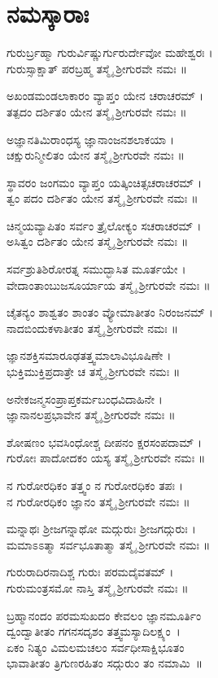 \section{ನಮಸ್ಕಾರಾಃ }
ಗುರುರ್ಬ್ರಹ್ಮಾ ಗುರುರ್ವಿಷ್ಣುರ್ಗುರುರ್ದೇವೋ ಮಹೇಶ್ವರಃ ।\\
ಗುರುಸ್ಸಾಕ್ಷಾತ್ ಪರಬ್ರಹ್ಮ ತಸ್ಮೈ ಶ್ರೀಗುರವೇ ನಮಃ ॥

ಅಖಂಡಮಂಡಲಾಕಾರಂ ವ್ಯಾಪ್ತಂ ಯೇನ ಚರಾಚರಮ್ ।\\
ತತ್ಪದಂ ದರ್ಶಿತಂ ಯೇನ ತಸ್ಮೈ ಶ್ರೀಗುರವೇ ನಮಃ ॥

ಅಜ್ಞಾನತಿಮಿರಾಂಧಸ್ಯ ಜ್ಞಾನಾಂಜನಶಲಾಕಯಾ ।\\
ಚಕ್ಷುರುನ್ಮೀಲಿತಂ ಯೇನ ತಸ್ಮೈ ಶ್ರೀಗುರವೇ ನಮಃ ॥

ಸ್ಥಾವರಂ ಜಂಗಮಂ ವ್ಯಾಪ್ತಂ ಯತ್ಕಿಂಚಿತ್ಸಚರಾಚರಮ್ ।\\
ತ್ವಂ ಪದಂ ದರ್ಶಿತಂ ಯೇನ ತಸ್ಮೈ ಶ್ರೀಗುರವೇ ನಮಃ ॥

ಚಿನ್ಮಯವ್ಯಾಪಿತಂ ಸರ್ವಂ ತ್ರೈಲೋಕ್ಯಂ ಸಚರಾಚರಮ್ ।\\
ಅಸಿತ್ವಂ ದರ್ಶಿತಂ ಯೇನ ತಸ್ಮೈ ಶ್ರೀಗುರವೇ ನಮಃ ॥ 

ಸರ್ವಶ್ರುತಿಶಿರೋರತ್ನ ಸಮುದ್ಭಾಸಿತ ಮೂರ್ತಯೇ ।\\
ವೇದಾಂತಾಂಬುಜಸೂರ್ಯಾಯ ತಸ್ಮೈ ಶ್ರೀಗುರವೇ ನಮಃ ॥

ಚೈತನ್ಯಂ ಶಾಶ್ವತಂ ಶಾಂತಂ ವ್ಯೋಮಾತೀತಂ ನಿರಂಜನಮ್ ।\\
ನಾದಬಿಂದುಕಳಾತೀತಂ ತಸ್ಮೈ ಶ್ರೀಗುರವೇ ನಮಃ ॥

ಜ್ಞಾನಶಕ್ತಿಸಮಾರೂಢತತ್ತ್ವಮಾಲಾವಿಭೂಷಿಣೇ ।\\
ಭುಕ್ತಿಮುಕ್ತಿಪ್ರದಾತ್ರೇ ಚ ತಸ್ಮೈ ಶ್ರೀಗುರವೇ ನಮಃ ॥

ಅನೇಕಜನ್ಮಸಂಪ್ರಾಪ್ತಕರ್ಮಬಂಧವಿದಾಹಿನೇ ।\\
ಜ್ಞಾನಾನಲಪ್ರಭಾವೇನ ತಸ್ಮೈ ಶ್ರೀಗುರವೇ ನಮಃ ॥ 

ಶೋಷಣಂ ಭವಸಿಂಧೋಶ್ಚ ದೀಪನಂ ಕ್ಷರಸಂಪದಾಮ್ ।\\
ಗುರೋಃ ಪಾದೋದಕಂ ಯಸ್ಯ ತಸ್ಮೈ ಶ್ರೀಗುರವೇ ನಮಃ ॥ 

ನ ಗುರೋರಧಿಕಂ ತತ್ತ್ವಂ ನ ಗುರೋರಧಿಕಂ ತಪಃ ।\\
ನ ಗುರೋರಧಿಕಂ ಜ್ಞಾನಂ ತಸ್ಮೈ ಶ್ರೀಗುರವೇ ನಮಃ ॥ 

ಮನ್ನಾಥಃ ಶ್ರೀಜಗನ್ನಾಥೋ ಮದ್ಗುರುಃ ಶ್ರೀಜಗದ್ಗುರುಃ ।\\
ಮಮಾಽಽತ್ಮಾ ಸರ್ವಭೂತಾತ್ಮಾ ತಸ್ಮೈ ಶ್ರೀಗುರವೇ ನಮಃ ॥

ಗುರುರಾದಿರನಾದಿಶ್ಚ ಗುರುಃ ಪರಮದೈವತಮ್ ।\\
ಗುರುಮಂತ್ರಸಮೋ ನಾಸ್ತಿ ತಸ್ಮೈ ಶ್ರೀಗುರವೇ ನಮಃ ॥

ಬ್ರಹ್ಮಾನಂದಂ ಪರಮಸುಖದಂ ಕೇವಲಂ ಜ್ಞಾನಮೂರ್ತಿಂ\\
ದ್ವಂದ್ವಾತೀತಂ ಗಗನಸದೃಶಂ ತತ್ತ್ವಮಸ್ಯಾದಿಲಕ್ಷ್ಯಂ~।\\
ಏಕಂ ನಿತ್ಯಂ ವಿಮಲಮಚಲಂ ಸರ್ವಧೀಸಾಕ್ಷಿಭೂತಂ\\
ಭಾವಾತೀತಂ ತ್ರಿಗುಣರಹಿತಂ ಸದ್ಗುರುಂ ತಂ ನಮಾಮಿ~॥

